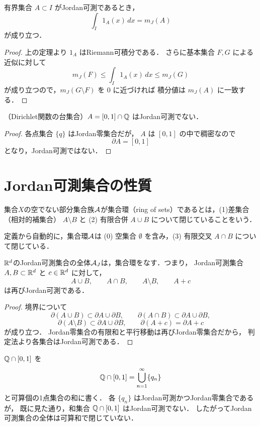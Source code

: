 \begin{corollary}
有界集合 $A \subset I$ がJordan可測であるとき，
\[
\int_I 1_A(x)\,dx = m_J(A)
\]
が成り立つ．
\end{corollary}
\begin{proof}
上の定理より $1_A$ はRiemann可積分である．
さらに基本集合 $F,G$ による近似に対して
\[
m_J(F) \le \int_I 1_A(x)\,dx \le m_J(G)
\]
が成り立つので，$m_J(G \setminus F)$ を $0$ に近づければ
積分値は $m_J(A)$ に一致する．
\end{proof}

\begin{example}
    （Dirichlet関数の台集合）$A = [0,1] \cap \mathbb Q$ はJordan可測でない．
\end{example}
\begin{proof}
    各点集合 $\{q\}$ はJordan零集合だが，
    $A$ は $[0,1]$ の中で稠密なので
\[
\partial A = [0,1]
\]
となり，Jordan可測ではない．
\end{proof}


\section{Jordan可測集合の性質}

    \begin{definition}[集合環]
集合$X$の空でない部分集合族$\mathcal A$が集合環（ring of sets）であるとは，(1)差集合（相対的補集合） $A \setminus B$ と (2) 有限合併 $A \cup B$ について閉じていることをいう．
    \end{definition}
    定義から自動的に，集合環$\mathcal A$は (0) 空集合 $\emptyset$ を含み，(3) 有限交叉 $A \cap B$ について閉じている．

\begin{theorem}[Jordan可測集合の集合演算に関する閉性]
    $\mathbb R^d$のJordan可測集合の全体$\mathcal A_J$は，集合環をなす．つまり，
Jordan可測集合 $A,B \subset \mathbb R^d$ と $c \in \mathbb R^d$ に対して，
\[
A \cup B,\qquad
A \cap B,\qquad
A \setminus B,\qquad
A+c
\]
は再びJordan可測である．
\end{theorem}
\begin{proof}
境界について
\[
\partial(A \cup B) \subset \partial A \cup \partial B,
\qquad
\partial(A \cap B) \subset \partial A \cup \partial B,
\]
\[
\partial(A \setminus B) \subset \partial A \cup \partial B,
\qquad
\partial(A+c) = \partial A + c
\]
が成り立つ．
Jordan零集合の有限和と平行移動は再びJordan零集合だから，
判定法より各集合はJordan可測である．
\end{proof}

\begin{example}[可算和に関して閉じていない]
$\mathbb Q \cap [0,1]$ を
    \[
    \mathbb Q \cap [0,1] = \bigcup_{n=1}^\infty \{q_n\}
    \]
    と可算個の1点集合の和に書く．
    各 $\{q_n\}$ はJordan可測かつJordan零集合であるが，
    既に見た通り，和集合 $\mathbb Q \cap [0,1]$ はJordan可測でない．
    したがってJordan可測集合の全体は可算和で閉じていない．
\end{example}

